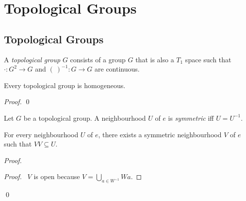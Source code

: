 \chapter{Topological Groups}

\section{Topological Groups}

\begin{df}
  A \emph{topological group} $G$ consists of a group $G$ that is also a $T_1$
  space such that $\cdot : G^2 \rightarrow G$ and $(\ )^{-1} : G \rightarrow
  G$ are continuous.
\end{df}

\begin{prop}
  Every topological group is homogeneous.
\end{prop}

\begin{proof}
  \pf
  \qed
\end{proof}

\begin{df}[Symmetric]
  Let $G$ be a topological group. A neighbourhood $U$ of $e$ is
  \emph{symmetric} iff $U = U^{-1}$.
\end{df}

\begin{prop}
  \label{prop:topological_group:neighbourhood}
  For every neighbourhood $U$ of $e$, there exists a symmetric neighbourhood
  $V$ of $e$ such that $VV \subseteq U$.
\end{prop}

\begin{proof}
  \pf
  \begin{proof}
    \pf\ $V$ is open because $V = \bigcup_{a \in W^{-1}} Wa$.  %
  \end{proof}
  \qed
\end{proof}

